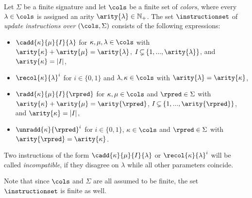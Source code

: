 \begin{definition}\label{def:instructions}
	Let $\Sigma$ be a finite signature and let $\cols$ be a finite set of \emph{colors}, where every $\lambda\in\cols$ is assigned an arity $\arity{\lambda}\in\mathbb{N}_{+}$.
	The set $\instructionset$ of \emph{update instructions over $(\cols, \Sigma)$} consists of the following expressions:
	\begin{itemize}
		\item \!$\cadd{\kappa}{\mu}{I}{\lambda}$ for $\kappa, \mu, \lambda\in \cols$ with  $\arity{\kappa}+\arity{\mu} = \arity{\lambda}$, $I{\,\subsetneq\,} \{ 1, ..., \arity{\lambda} \}$, and $\arity{\kappa} = |I|$,
		\item \!$\recol{\kappa}{\lambda}^i$ for $i\in \{0,1\}$ and $\lambda, \kappa\in\cols$ with $\arity{\lambda}=\arity{\kappa}$,		
		\item \!$\radd{\kappa}{\mu}{I}{\rpred}$ for $\kappa, \mu\in \cols$ and $\rpred\in \Sigma$ with $\arity{\kappa}+\arity{\mu} = \arity{\rpred}$, $I {\,\subsetneq\,} \{ 1, ..., \arity{\rpred} \}$, and $\arity{\kappa} = |I|$, 
		\item \!$\unradd{\kappa}{\rpred}^i$ for $i\in \{0,1\}$, $\kappa\in\cols$ and $\rpred\in \Sigma$ with $\arity{\rpred} = \arity{\kappa}$.

	\end{itemize}
	Two instructions of the form $\cadd{\kappa}{\mu}{I}{\lambda}$ or $\recol{\kappa}{\lambda}^i$ will be called \emph{incompatible}, if they disagree on $\lambda$ while all other parameters coincide.
\end{definition}
Note that since $\cols$ and $\Sigma$ are all assumed to be finite, the set $\instructionset$ is finite as well.
\pagebreak

